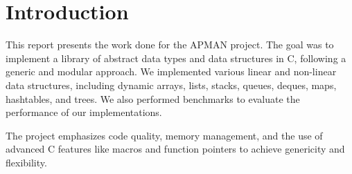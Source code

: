 \chapter*{Introduction}\label{chap:introduction}

This report presents the work done for the APMAN project. The goal was to implement a library of abstract data types and data structures in C, following a generic and modular approach. We implemented various linear and non-linear data structures, including dynamic arrays, lists, stacks, queues, deques, maps, hashtables, and trees. We also performed benchmarks to evaluate the performance of our implementations.

The project emphasizes code quality, memory management, and the use of advanced C features like macros and function pointers to achieve genericity and flexibility.
